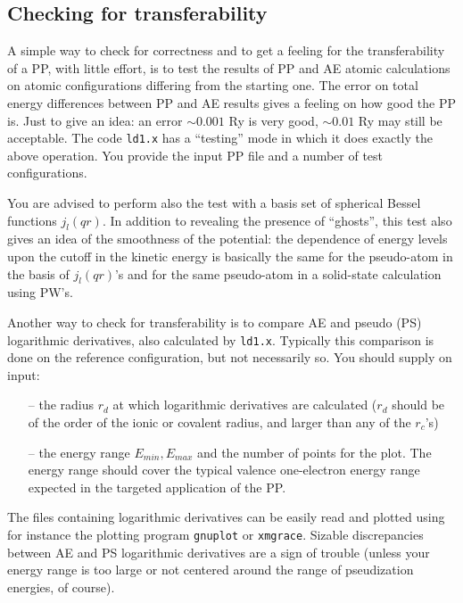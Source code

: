 \documentclass[12pt,a4paper]{article}
\begin{document}
\subsection{Checking for transferability}
\label{trans}
A simple way to check for correctness and to get a feeling for 
the transferability of a PP, with little effort, is to test the 
results of PP and AE atomic calculations on atomic configurations 
differing from the starting one. The error on total energy 
differences between PP and AE results gives a feeling on how 
good the PP is. Just to give an idea: an error $\sim 0.001$ Ry 
is very good, $\sim 0.01$ Ry may still be acceptable.
The code \texttt{ld1.x} has a ``testing'' mode in which it does
exactly the above operation. You provide the input PP file and
a number of test configurations.

You are advised to perform also the test with a basis set of spherical
Bessel functions $j_l (qr)$. In addition to revealing the presence of
``ghosts'', this test also gives an idea of the smoothness of the 
potential: the dependence of energy levels upon the cutoff in the kinetic 
energy is basically the same for the pseudo-atom in the basis of $j_l (qr)$'s
and for the same pseudo-atom in a solid-state calculation using PW's.

Another way to check for transferability is to compare AE and pseudo (PS) 
logarithmic derivatives, also calculated by \texttt{ld1.x}. Typically 
this comparison is done on the reference configuration,
but not necessarily so. You should supply on input:
\begin{enumerate}
\item[--] the radius $r_d$ at which logarithmic derivatives are 
          calculated ($r_d$ should be of the order of the
          ionic or covalent radius, and larger than any of the $r_c$'s)
\item[--] the energy range $E_{min}, E_{max}$ and the number 
          of points for the plot. The energy range
          should cover the typical valence one-electron energy 
          range expected in the targeted application of the PP. 
\end{enumerate}
The files containing logarithmic derivatives can be easily read and 
plotted using for instance the plotting program \texttt{gnuplot} 
or \texttt{xmgrace}. 
Sizable discrepancies between AE and PS logarithmic derivatives 
are a sign of trouble (unless your energy range is too large or 
not centered around the range of pseudization energies, of course).
\end{document}
